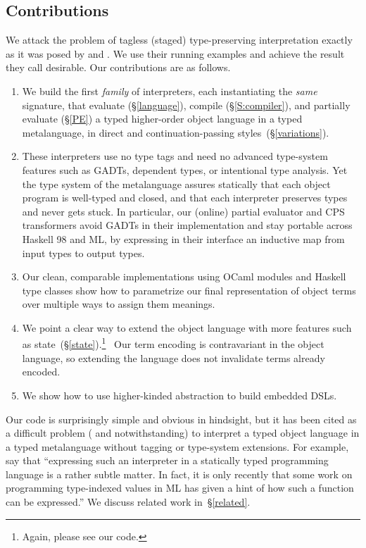 \subsection{Contributions}\label{contributions}

We attack the problem of tagless (staged) type-preserving
interpretation exactly as it was posed
by \citet{WalidICFP02} and \citet{xi-guarded}.
We use their running examples and achieve the
result they call desirable.  Our contributions are as follows.
\begin{enumerate}
\item We build the first \emph{family} of interpreters, each instantiating the
   \emph{same} signature, that evaluate (\S\ref{language}),
   compile (\S\ref{S:compiler}), and 
   partially evaluate (\S\ref{PE}) a typed higher-order object language
   in a typed metalanguage, in direct and continuation\hyp passing
   styles\ifshort\else\ (\S\ref{variations})\fi.
\item These interpreters use no type tags
    and need no advanced type-system features such as GADTs, dependent types,
    or intentional type analysis.
    Yet the type system of the metalanguage
    assures statically that each object program is well-typed and closed,
    and that each interpreter preserves types and never gets stuck.
    In particular, our (online) partial evaluator and CPS transformers
    avoid GADTs in their implementation and stay portable across
    Haskell 98 and ML, by expressing in their interface an inductive
    map from input types to output types.
\item Our clean, comparable implementations using OCaml modules and Haskell
    type classes show how to parametrize our final representation of object
    terms over multiple ways to assign them meanings.
\item We point a clear way to extend the object language with more features
    such as state\ifshort\else~(\S\ref{state})\fi.\ifshort\footnote{Again, please see our code.}\fi
    \ Our term encoding is contravariant in the object language, so
    extending the language does not invalidate terms already encoded.
\item We show how to use higher-kinded abstraction to build
    embedded DSLs.
\end{enumerate}
Our code is surprisingly simple and obvious in hindsight, but
it has been cited as a difficult problem (\cite{sumii-hybrid}
and \cite{Thiemann-combinators}
notwithstanding) to interpret a typed object language in a typed metalanguage
without tagging or type\hyp system extensions.  For example, \citet{taha-tag}
say that ``expressing such an interpreter in a statically typed
programming language is a rather subtle matter. In fact, it is only
recently that some work on programming type-indexed values in ML
\citep{yang-encoding} has given a hint of how such a function can be
expressed.''  We discuss related work in~\S\ref{related}.

